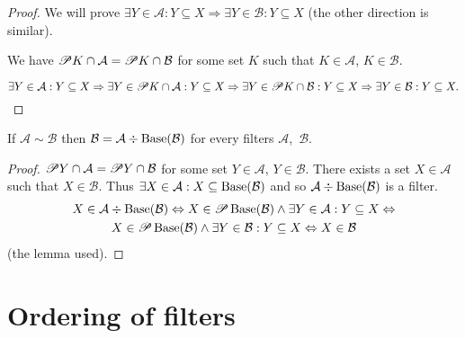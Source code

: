 \begin{proof}
We will prove $\exists Y\in\mathcal{A}:Y\subseteq X\Rightarrow\exists Y\in\mathcal{B}:Y\subseteq X$
(the other direction is similar).

We have $\mathscr{P} K\cap\mathcal{A}=\mathscr{P} K\cap\mathcal{B}$ for
some set $K$ such that $K\in\mathcal{A}$, $K\in\mathcal{B}$.

\[
\exists Y\in\mathcal{A}:Y\subseteq X\Rightarrow\exists Y\in\mathscr{P} K\cap\mathcal{A}:Y\subseteq X\Rightarrow\exists Y\in\mathscr{P} K\cap\mathcal{B}:Y\subseteq X\Rightarrow\exists Y\in\mathcal{B}:Y\subseteq X.
\]
\end{proof}
\begin{prop}
If $\mathcal{A}\sim\mathcal{B}$ then $\mathcal{B}=\mathcal{A}\div\operatorname{Base}(\mathcal{B})$
for every filters $\mathcal{A}$,~$\mathcal{B}$.\end{prop}
\begin{proof}
$\mathscr{P} Y\cap\mathcal{A}=\mathscr{P} Y\cap\mathcal{B}$ for some set
$Y\in\mathcal{A}$, $Y\in\mathcal{B}$. There exists a set $X\in\mathcal{A}$
such that $X\in\mathcal{B}$. Thus $\exists X\in\mathcal{A}:X\subseteq\operatorname{Base}(\mathcal{B})$
and so $\mathcal{A}\div\operatorname{Base}(\mathcal{B})$ is a filter.
\begin{multline*}
X\in\mathcal{A}\div\operatorname{Base}(\mathcal{B})\Leftrightarrow X\in\mathscr{P}\operatorname{Base}(\mathcal{B})\land\exists Y\in\mathcal{A}:Y\subseteq X\Leftrightarrow\\
X\in\mathscr{P}\operatorname{Base}(\mathcal{B})\land\exists Y\in\mathcal{B}:Y\subseteq X\Leftrightarrow X\in\mathcal{B}
\end{multline*}
(the lemma used).
\end{proof}

\section{Ordering of filters}

